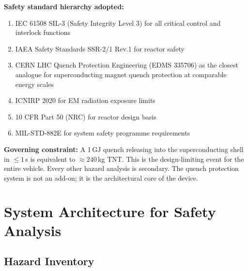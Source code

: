 \documentclass[11pt,a4paper]{article}
\begin{document}
\textbf{Safety standard hierarchy adopted:}
\begin{enumerate}[nosep]
  \item IEC 61508 SIL-3 (Safety Integrity Level 3) for all
    critical control and interlock functions
  \item IAEA Safety Standards SSR-2/1 Rev.1 for reactor safety
  \item CERN LHC Quench Protection Engineering (EDMS 335706) as
    the closest analogue for superconducting magnet quench protection
    at comparable energy scales
  \item ICNIRP 2020 for EM radiation exposure limits
  \item 10 CFR Part 50 (NRC) for reactor design basis
  \item MIL-STD-882E for system safety programme requirements
\end{enumerate}

\begin{critbox}
\textbf{Governing constraint:} A 1\,GJ quench releasing into
the superconducting shell in $\leq 1$\,s is equivalent to
$\approx 240$\,kg TNT. This is the design-limiting event for
the entire vehicle. Every other hazard analysis is secondary.
The quench protection system is not an add-on; it is the
architectural core of the device.
\end{critbox}

\section{System Architecture for Safety Analysis}

\subsection{Hazard Inventory}
\end{document}

